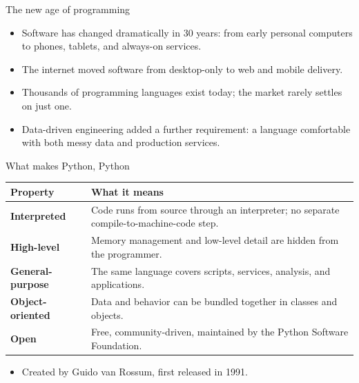 \begin{frame}{The new age of programming}
\begin{itemize}
\item Software has changed dramatically in 30 years: from early personal computers to phones, tablets, and always-on services.
\item The internet moved software from desktop-only to web and mobile delivery.
\item Thousands of programming languages exist today; the market rarely settles on just one.
\item Data-driven engineering added a further requirement: a language comfortable with both messy data and production services.
\end{itemize}
\coursefooter
\end{frame}

\begin{frame}{What makes Python, Python}
\begin{tabularx}{\textwidth}{>{\bfseries}l X}
Property & What it means \\
\toprule
Interpreted & Code runs from source through an interpreter; no separate compile-to-machine-code step. \\
High-level & Memory management and low-level detail are hidden from the programmer. \\
General-purpose & The same language covers scripts, services, analysis, and applications. \\
Object-oriented & Data and behavior can be bundled together in classes and objects. \\
Open & Free, community-driven, maintained by the Python Software Foundation. \\
\bottomrule
\end{tabularx}
\vspace{0.4em}
\begin{itemize}
\item Created by Guido van Rossum, first released in 1991.
\end{itemize}
\coursefooter
\end{frame}


